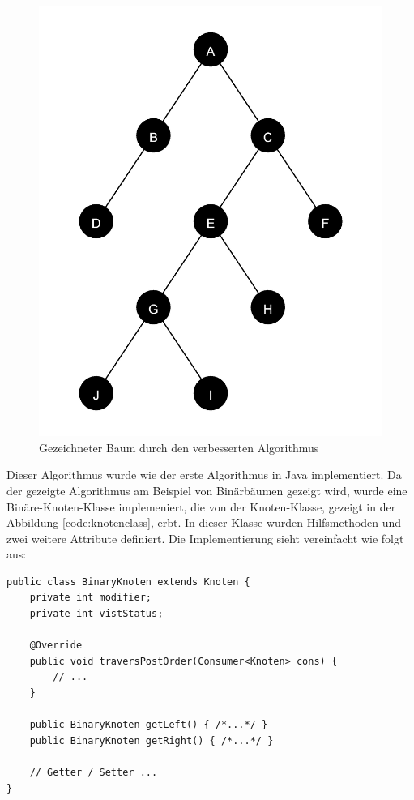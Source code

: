 \begin{figure}[H]
    \centering
    \includegraphics[scale = 0.10]{abbildungen/baum_algo_2}
    \caption{Gezeichneter Baum durch den verbesserten Algorithmus}
    \label{pic:baum_algo_2} 
\end{figure}

Dieser Algorithmus wurde wie der erste Algorithmus in Java implementiert. Da der gezeigte Algorithmus
am Beispiel von Binärbäumen gezeigt wird, wurde eine Binäre-Knoten-Klasse implemeniert,
die von der Knoten-Klasse, gezeigt in der Abbildung \ref{code:knotenclass}, erbt. In dieser Klasse wurden
Hilfsmethoden und zwei weitere Attribute definiert. Die Implementierung sieht vereinfacht wie folgt aus:

\begin{lstlisting}[caption=Vereinfachte Implementierung der BinaryKnoten-Klasse, label=code:binaryknotenclass]
public class BinaryKnoten extends Knoten {
    private int modifier;
	private int vistStatus;

    @Override
	public void traversPostOrder(Consumer<Knoten> cons) { 
        // ...
    }

    public BinaryKnoten getLeft() { /*...*/ }
    public BinaryKnoten getRight() { /*...*/ }

    // Getter / Setter ...
}
\end{lstlisting}


